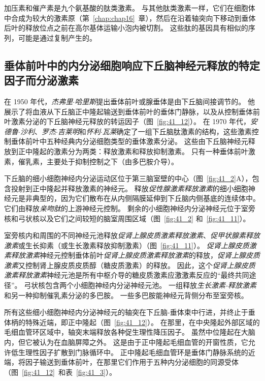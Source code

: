 加压素和催产素是九个氨基酸的肽类激素。
与其他肽类激素一样，它们在细胞体中合成为较大的激素原（第~\ref{chap:chap16}~章），然后在沿着轴突向下移动到垂体后叶的释放位点之前在高尔基体运输小泡内被切割。
这些肽的基因具有相似的序列，可能是通过复制产生的。



\subsection{垂体前叶中的内分泌细胞响应下丘脑神经元释放的特定因子而分泌激素}

在 1950 年代，\textit{杰弗里$\cdot$哈里斯}提出垂体前叶或腺垂体是由下丘脑间接调节的。
他展示了将血液从下丘脑正中隆起输送到垂体前叶的垂体门静脉，以及从控制垂体前叶激素分泌的下丘脑神经元释放的转运因子（图~\ref{fig:41_12}）。
在 1970 年代，\textit{安德鲁$\cdot$沙利}、\textit{罗杰$\cdot$吉莱明}和\textit{怀利$\cdot$瓦莱}确定了一组下丘脑肽激素的结构，这些激素控制垂体前叶中五种经典内分泌细胞类型的垂体激素分泌。
这些由下丘脑神经元释放到正中隆起的激素分为两类：释放激素和释放抑制激素。
只有一种垂体前叶激素，催乳素，主要处于抑制控制之下（由多巴胺介导）。


下丘脑的细小细胞神经内分泌运动区位于第三脑室壁的中心（图~\ref{fig:41_2}A），包含投射到正中隆起并释放激素的神经元。
释放\textit{促性腺激素释放激素}的细小细胞神经元是非典型的，因为它们散布在从内侧隔膜延伸到下丘脑内侧基底的连续体中。
它们由释放\textit{亲吻肽}的上游神经元控制。
剩余的小细胞神经内分泌神经元位于室旁核和弓状核以及它们之间较短的脑室周围区域（图~\ref{fig:41_2} 和~\ref{fig:41_11}）。


室旁核内和周围的不同神经元池释放\textit{促肾上腺皮质激素释放激素}、\textit{促甲状腺素释放激素}或生长抑素（或生长激素释放抑制激素）（图~\ref{fig:41_11}）。
\textit{促肾上腺皮质激素释放激素}神经元控制垂体前叶\textit{促肾上腺皮质激素释放激素}的释放，\textit{促肾上腺皮质激素}又控制肾上腺皮质皮质醇（糖皮质激素）的释放。
因此，这个\textit{促肾上腺皮质激素释放激素}神经元池是所有中枢介导的糖皮质激素应激激素反应的“最终共同途径”。 弓状核包含两个小细胞神经内分泌神经元池。
一组释放\textit{生长激素-释放激素}和另一种抑制催乳素分泌的多巴胺。
一些多巴胺能神经元背侧分布至室旁核。


所有这些细小细胞神经内分泌神经元的轴突在下丘脑-垂体束中行进，并终止于垂体柄的特殊近端，即正中隆起（图~\ref{fig:41_12}）。
在那里，在中央隆起外部区域的毛细血管环区域中，轴突末端释放各种促生理性降压因子。
虽然中位隆起在大脑内，但它被认为在血脑屏障之外。
这是由于正中隆起毛细血管的开窗性质，它允许低生理性因子扩散到门脉循环中。
正中隆起毛细血管环是垂体门静脉系统的近端，将因子输送到垂体前叶，在那里它们作用于五种内分泌细胞的同源受体（图~\ref{fig:41_12}~和表~\ref{fig:41_3}）。


